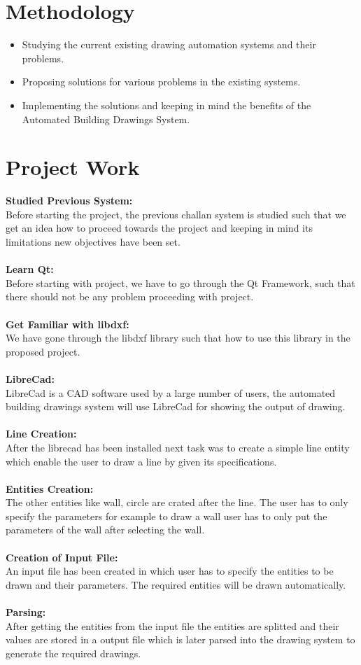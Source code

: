 \section{Methodology}
\begin{itemize}
\item Studying the current existing drawing automation systems and their problems.
\item Proposing solutions for various problems in the existing systems.
\item Implementing the solutions and keeping in mind the benefits of the Automated Building Drawings System.
\end{itemize}

\section{Project Work} 
\textbf{Studied Previous System:}\\
Before starting the project, the previous challan system is studied such that we get an idea how to
proceed towards the project and keeping in mind its limitations new objectives have been set.\\\\
\textbf{Learn Qt:}\\
Before starting with project, we have to go through the Qt Framework, such that there
should not be any problem proceeding with project.\\\\
\textbf{Get Familiar with libdxf:}\\
We have gone through the libdxf library such that how to use this library in the proposed project.\\\\
\textbf{LibreCad:}\\
LibreCad is a CAD software used by a large number of users, the automated building drawings system will use LibreCad for showing the output of drawing.\\\\
\textbf{Line Creation:}\\
After the librecad has been installed next task was to create a simple line entity which enable the user to draw a line by given its specifications.\\\\
\textbf{Entities Creation:}\\
The other entities like wall, circle are crated after the line. The user has to only specify the parameters for example to draw a wall user has to only put the parameters of the wall after selecting the wall.\\\\
\textbf{Creation of Input File:}\\
An input file has been created in which user has to specify the entities to be drawn and their parameters. The required entities will be drawn automatically.\\\\
\textbf{Parsing:}\\
After getting the entities from the input file the entities are splitted and their values are stored in a output file which is later parsed into the drawing system to generate the required drawings.


